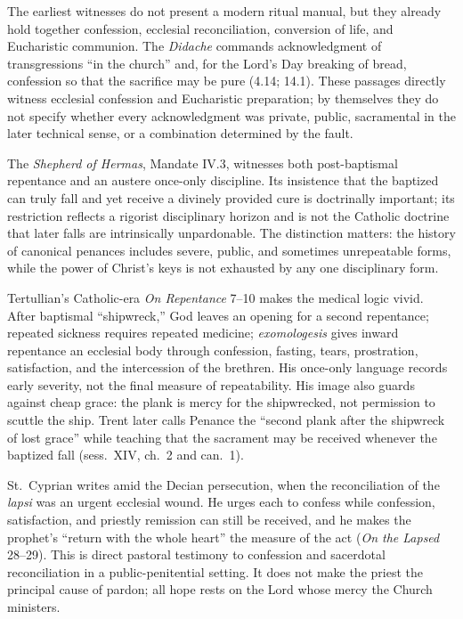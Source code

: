 The earliest witnesses do not present a modern ritual manual, but they already hold together confession, ecclesial reconciliation, conversion of life, and Eucharistic communion. The \emph{Didache} commands acknowledgment of transgressions ``in the church'' and, for the Lord's Day breaking of bread, confession so that the sacrifice may be pure (4.14; 14.1). These passages directly witness ecclesial confession and Eucharistic preparation; by themselves they do not specify whether every acknowledgment was private, public, sacramental in the later technical sense, or a combination determined by the fault.

The \emph{Shepherd of Hermas}, Mandate IV.3, witnesses both post-baptismal repentance and an austere once-only discipline. Its insistence that the baptized can truly fall and yet receive a divinely provided cure is doctrinally important; its restriction reflects a rigorist disciplinary horizon and is not the Catholic doctrine that later falls are intrinsically unpardonable. The distinction matters: the history of canonical penances includes severe, public, and sometimes unrepeatable forms, while the power of Christ's keys is not exhausted by any one disciplinary form.

Tertullian's Catholic-era \emph{On Repentance} 7--10 makes the medical logic vivid. After baptismal ``shipwreck,'' God leaves an opening for a second repentance; repeated sickness requires repeated medicine; \emph{exomologesis} gives inward repentance an ecclesial body through confession, fasting, tears, prostration, satisfaction, and the intercession of the brethren. His once-only language records early severity, not the final measure of repeatability. His image also guards against cheap grace: the plank is mercy for the shipwrecked, not permission to scuttle the ship. Trent later calls Penance the ``second plank after the shipwreck of lost grace'' while teaching that the sacrament may be received whenever the baptized fall (sess.~XIV, ch.~2 and can.~1).

St.~Cyprian writes amid the Decian persecution, when the reconciliation of the \emph{lapsi} was an urgent ecclesial wound. He urges each to confess while confession, satisfaction, and priestly remission can still be received, and he makes the prophet's ``return with the whole heart'' the measure of the act (\emph{On the Lapsed} 28--29). This is direct pastoral testimony to confession and sacerdotal reconciliation in a public-penitential setting. It does not make the priest the principal cause of pardon; all hope rests on the Lord whose mercy the Church ministers.

